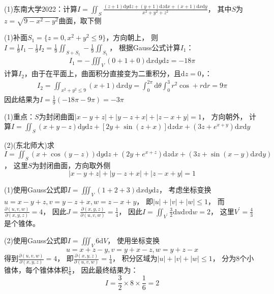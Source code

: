 ~

\begin{exercise}[补面计算]
  (1)东南大学2022：计算$I = \iint_S \frac{(z+1)\mathrm{d} y \mathrm{d} z + (y+1) \mathrm{d} z \mathrm{d} x + (x+1)\mathrm{d} x \mathrm{d} y}{x^2 + y^2 + z^2}$，
  其中$S$为$z = \sqrt{9 - x^2 - y^2}$曲面，取下侧
\end{exercise}

\begin{solution}
  (1)补面$S_1 = \{z = 0, x^2 + y^2 \leq 9\}$，方向朝上，
  则$I = \frac{1}{9}I_1 - \frac{1}{9}I_2 = \frac{1}{9}\iint_{S+S_1} - \frac{1}{9}\iint_{S_1}$，
  根据Gauss公式计算$I_1$：
  \begin{align*}
    I_1 = - \iiint_V (0 + 1 + 0)\mathrm{d} x \mathrm{d} y \mathrm{d} z = - 18\pi
  \end{align*}
  计算$I_2$，由于在平面上，曲面积分直接变为二重积分，且$\mathrm{d} z = 0$，：
  \begin{align*}
    I_2 = \iint_{x^2 + y^2 \leq 9}(x + 1)\mathrm{d} x \mathrm{d} y = \int_0^{2\pi}\mathrm{d} \theta\int_0^3 r^2 \cos + r\mathrm{d} r = 9\pi
  \end{align*}
  因此结果为$I = \frac{1}{9}(-18\pi - 9\pi) = -3\pi$
\end{solution}


\begin{exercise}
  (1)重点：$S$为封闭曲面$|x-y+z| + |y - z + x| + |z - x + y| = 1$，
  方向朝外，
  计算$I = \iint_S (x + y - z)\mathrm{d} y \mathrm{d} z + [2y + \sin(z + x)]\mathrm{d} z \mathrm{d} x + (3z + e^{x+y})\mathrm{d} x \mathrm{d} y$

  (2)(东北师大)求$I = \iint_S (x + \cos (y-z))\mathrm{d} y \mathrm{d} z + (2y + e^{x+z})\mathrm{d} z \mathrm{d} x + (3z + \sin(x-y)\mathrm{d} x \mathrm{d} y)$，
  这里$S$为封闭曲面，方向取外侧
  \begin{equation*}
    |x-y+z| + |y-z+x| + |z - x+y| = 1
  \end{equation*}
\end{exercise}


\begin{solution}
  (1)使用Gauss公式即$I = \iiint_V (1 + 2 + 3)\mathrm{d} x \mathrm{d} y \mathrm{d} z$，
  考虑坐标变换$u = x - y + z, v = y - z + x, w = z - x + y$，
  即$|u| + |v| + |w| \leq 1$，
  而$\frac{\partial (u,v,w)}{\partial(x,y,z)} = 4$，
  因此$J = \frac{\partial(x,y,z)}{\partial(u,v,w)} = \frac{1}{4}$，
  因此$I = \iint_{V^{\prime}} \frac{3}{2}\mathrm{d} u \mathrm{d} v \mathrm{d} w = 2$，
  这里$V^{\prime} = \frac{4}{3}$是个锥体。

  (2)使用Gauss公式即$I = \iiint_V 6 \mathrm{d} V$，
  使用坐标变换
  \begin{equation*}
    u = x + z - y, v = y + x - z, w = y + z - x
  \end{equation*}
  得到$\frac{\partial(u,v,w)}{\partial(x,y,z)} = 4$，
  即$\frac{\partial(x,y,z)}{\partial(u,v,w)} = \frac{1}{4}$，
  积分区域为$|u| + |v| + |w| \leq 1$，
  分为$8$个小锥体，每个锥体体积$\frac{1}{6}$，
  因此最终结果为：
  \begin{equation*}
    I = \frac{3}{2} \times 8 \times \frac{1}{6} = 2
  \end{equation*}
\end{solution}

